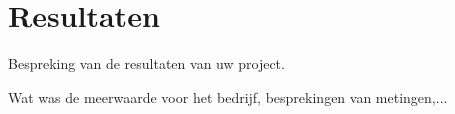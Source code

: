 \chapter[Resultaten]{Resultaten}
\label{chap_resultaten}

Bespreking van de resultaten van uw project.

Wat was de meerwaarde voor het bedrijf, besprekingen van metingen,...